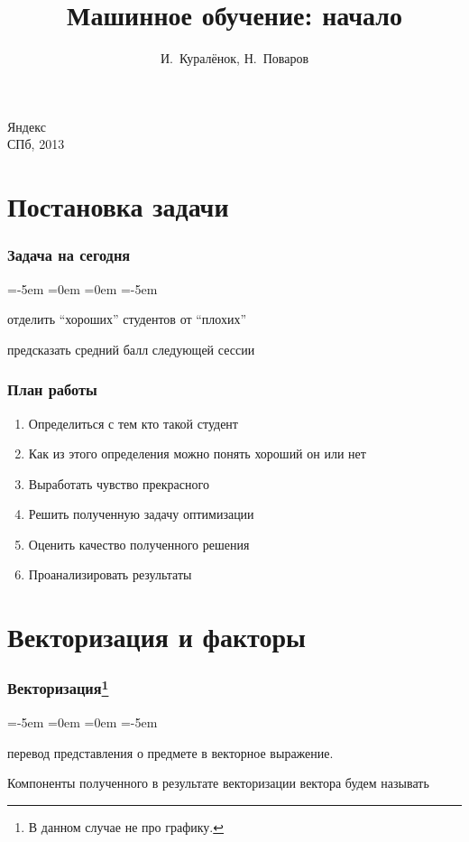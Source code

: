 \documentclass[14pt, fleqn, xcolor={dvipsnames, table}, hyperref={unicode}, babel={english,russian}, inputenc=utf8x]{beamer}
\title{Машинное обучение: начало\\\small{}}
\author[]{\small{%
И.~Куралёнок,
Н.~Поваров}}
\date{}
\begin{document}
\begin{frame}
\maketitle
\small
\begin{center}
\vspace{-60pt}
\normalsize {\color{red}Я}ндекс \\
\vspace{80pt}
\footnotesize СПб, 2013
\end{center}
\end{frame}

\section{Постановка задачи}
\begin{frame}
\frametitle{Задача на сегодня}
\begin{description}
\leftmargin=-5em
\itemindent=0em
=0em
\leftskip=-5em
\item[Задача:] отделить ``хороших'' студентов от ``плохих''
\item
\item[Формально:] предсказать средний балл следующей сессии
\end{description}
\end{frame}

\begin{frame}
\frametitle{План работы}
\begin{enumerate}
\item Определиться с тем кто такой студент
\item Как из этого определения можно понять хороший он или нет
\item Выработать чувство прекрасного
\item Решить полученную задачу оптимизации
\item Оценить качество полученного решения
\item Проанализировать результаты
\end{enumerate}
\end{frame}

\section{Векторизация и факторы}
\begin{frame}
\frametitle{Векторизация\footnote{В данном случае не про графику.}}
\begin{description}
\leftmargin=-5em
\itemindent=0em
=0em
\leftskip=-5em
\item[Векторизация:] перевод представления о предмете в векторное выражение.
\item[]
\item[] Компоненты полученного в результате векторизации вектора будем называть {}
\end{description}
\end{frame}
\end{document}
